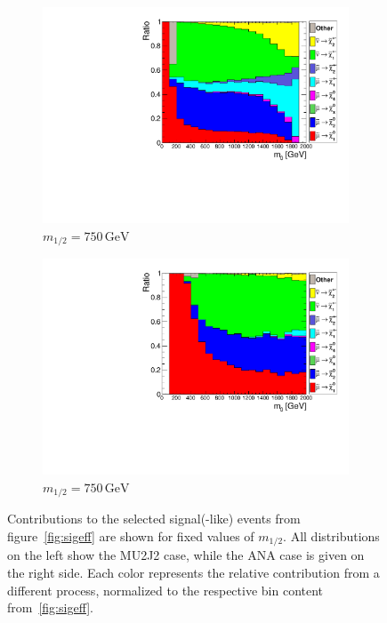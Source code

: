 \begin{figure}[ht!]
  \begin{subfigure}[b]{0.495\textwidth}
    \centering
    \includegraphics[width=\textwidth]{plots/hCrossRatio750.pdf}
    \caption{$m_{1/2} = 750\,\text{GeV}$\label{fig:crossratio750}}
  \end{subfigure}
  \begin{subfigure}[b]{0.495\textwidth}
    \centering
    \includegraphics[width=\textwidth]{plots/hCutCrossRatio750.pdf}
    \caption{$m_{1/2} = 750\,\text{GeV}$\label{fig:cutcrossratio750}}
  \end{subfigure}

  \caption{Contributions to the selected signal(-like) events from figure~\ref{fig:sigeff} are shown for fixed values of $m_{1/2}$. All distributions on the left show the MU2J2 case, while the ANA case is given on the right side. Each color represents the relative contribution from a different process, normalized to the respective bin content from~\ref{fig:sigeff}.}
  \label{fig:crossratios}
\end{figure}

